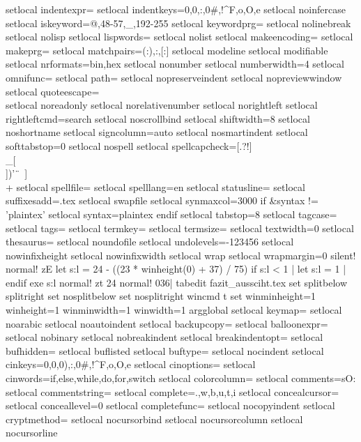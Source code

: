 {{{setlocal indentexpr=
setlocal indentkeys=0{,0},:,0#,!^F,o,O,e
setlocal noinfercase
setlocal iskeyword=@,48-57,_,192-255
setlocal keywordprg=
setlocal nolinebreak
setlocal nolisp
setlocal lispwords=
setlocal nolist
setlocal makeencoding=
setlocal makeprg=
setlocal matchpairs=(:),{:},[:]
setlocal modeline
setlocal modifiable
setlocal nrformats=bin,hex
setlocal nonumber
setlocal numberwidth=4
setlocal omnifunc=
setlocal path=
setlocal nopreserveindent
setlocal nopreviewwindow
setlocal quoteescape=\\
setlocal noreadonly
setlocal norelativenumber
setlocal norightleft
setlocal rightleftcmd=search
setlocal noscrollbind
setlocal shiftwidth=8
setlocal noshortname
setlocal signcolumn=auto
setlocal nosmartindent
setlocal softtabstop=0
setlocal nospell
setlocal spellcapcheck=[.?!]\\_[\\])'\"\	\ ]\\+
setlocal spellfile=
setlocal spelllang=en
setlocal statusline=
setlocal suffixesadd=.tex
setlocal swapfile
setlocal synmaxcol=3000
if &syntax != 'plaintex'
setlocal syntax=plaintex
endif
setlocal tabstop=8
setlocal tagcase=
setlocal tags=
setlocal termkey=
setlocal termsize=
setlocal textwidth=0
setlocal thesaurus=
setlocal noundofile
setlocal undolevels=-123456
setlocal nowinfixheight
setlocal nowinfixwidth
setlocal wrap
setlocal wrapmargin=0
silent! normal! zE
let s:l = 24 - ((23 * winheight(0) + 37) / 75)
if s:l < 1 | let s:l = 1 | endif
exe s:l
normal! zt
24
normal! 036|
tabedit fazit_aussciht.tex
set splitbelow splitright
set nosplitbelow
set nosplitright
wincmd t
set winminheight=1 winheight=1 winminwidth=1 winwidth=1
argglobal
setlocal keymap=
setlocal noarabic
setlocal noautoindent
setlocal backupcopy=
setlocal balloonexpr=
setlocal nobinary
setlocal nobreakindent
setlocal breakindentopt=
setlocal bufhidden=
setlocal buflisted
setlocal buftype=
setlocal nocindent
setlocal cinkeys=0{,0},0),:,0#,!^F,o,O,e
setlocal cinoptions=
setlocal cinwords=if,else,while,do,for,switch
setlocal colorcolumn=
setlocal comments=sO:%
setlocal commentstring=%
setlocal complete=.,w,b,u,t,i
setlocal concealcursor=
setlocal conceallevel=0
setlocal completefunc=
setlocal nocopyindent
setlocal cryptmethod=
setlocal nocursorbind
setlocal nocursorcolumn
setlocal nocursorline
}}}
